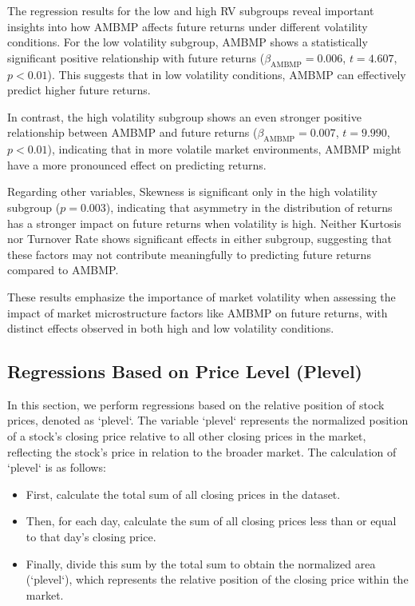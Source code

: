 \documentclass[preprint,12pt,authoryear]{elsarticle}
\begin{document}
The regression results for the low and high RV subgroups reveal important insights into how AMBMP affects future returns under different volatility conditions. For the low volatility subgroup, AMBMP shows a statistically significant positive relationship with future returns (\(\beta_{\mathrm{AMBMP}} = 0.006\), \(t = 4.607\), \(p < 0.01\)). This suggests that in low volatility conditions, AMBMP can effectively predict higher future returns. 

In contrast, the high volatility subgroup shows an even stronger positive relationship between AMBMP and future returns (\(\beta_{\mathrm{AMBMP}} = 0.007\), \(t = 9.990\), \(p < 0.01\)), indicating that in more volatile market environments, AMBMP might have a more pronounced effect on predicting returns. 

Regarding other variables, Skewness is significant only in the high volatility subgroup (\(p = 0.003\)), indicating that asymmetry in the distribution of returns has a stronger impact on future returns when volatility is high. Neither Kurtosis nor Turnover Rate shows significant effects in either subgroup, suggesting that these factors may not contribute meaningfully to predicting future returns compared to AMBMP.

These results emphasize the importance of market volatility when assessing the impact of market microstructure factors like AMBMP on future returns, with distinct effects observed in both high and low volatility conditions.

\subsection{Regressions Based on Price Level (Plevel)}

In this section, we perform regressions based on the relative position of stock prices, denoted as `plevel`. The variable `plevel` represents the normalized position of a stock's closing price relative to all other closing prices in the market, reflecting the stock's price in relation to the broader market. The calculation of `plevel` is as follows:

\begin{itemize}
    \item First, calculate the total sum of all closing prices in the dataset.
    \item Then, for each day, calculate the sum of all closing prices less than or equal to that day's closing price.
    \item Finally, divide this sum by the total sum to obtain the normalized area (`plevel`), which represents the relative position of the closing price within the market.
\end{itemize}
\end{document}
